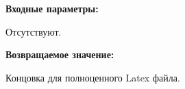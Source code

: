 \textbf{Входные параметры:}

Отсутствуют.

\textbf{Возвращаемое значение:}

Концовка для полноценного Latex файла.